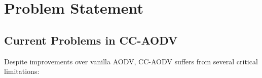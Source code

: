 \documentclass[12pt,a4paper]{article}
\begin{document}

\section{Problem Statement}

\subsection{Current Problems in CC-AODV}

Despite improvements over vanilla AODV, CC-AODV suffers from several critical limitations:
\end{document}
